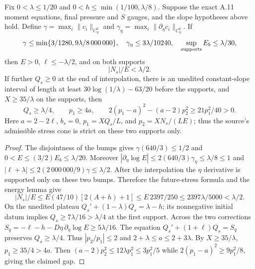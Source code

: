 \begin{theorem}
Fix $0<\lambda\le1/20$ and
$0<h\le\min(1/100,\lambda/8)$.
Suppose the exact A.11 moment equations, final pressure and $S$
gauges, and the slope hypotheses above hold. Define
$\gamma=\max_i\|c_i\|_{C^0_\eta}$ and
$\gamma_\eta=\max_i\|\partial_\eta c_i\|_{C^0_\eta}$.
If
\begin{equation}\label{eq:A11-certificate-data}
\gamma\le\min\{3/1280,9\lambda/8\,000\,000\},\quad
\gamma_\eta\le3\lambda/10240,\quad
\sup_{\rm supports}E_b\le\lambda/30,
\end{equation}
then $E>0$, $\ell\le-\lambda/2$, and on both supports
\begin{equation}\label{eq:A11-support-Ns}
\boxed{|N_s|/E<\lambda/2}.
\end{equation}
If further $Q_s\ge0$ at the end of interpolation,
there is an unedited constant-slope interval of length at least
$30\log(1/\lambda)-63/20$ before the supports, and
$X\ge35/\lambda$ on the supports, then
\begin{equation}\label{eq:A11-support-cone}
Q_s\ge\lambda/4,\qquad p_1\ge4a,\qquad
2(p_1-a)^2-(a-2)p_2^2\ge21p_1^2/40>0.
\end{equation}
Here $a=2-2\ell$, $b_s=0$,
$p_1=XQ_s/L$, and $p_2=XN_s/(LE)$; thus
the source's admissible stress cone is strict on these
two supports only.
\end{theorem}
\begin{proof}
The disjointness of the bumps gives
$\gamma(640/3)\le1/2$ and
$0<E\le(3/2)E_b\le\lambda/20$.
Moreover
$|\partial_\eta\log E|\le2(640/3)\gamma_\eta
\le\lambda/8\le1$ and
$|\ell+\lambda|\le2(2\,000\,000/9)\gamma\le\lambda/2$.
After the interpolation the $\eta$ derivative is supported only
on these two bumps. Therefore the future-stress formula and
the energy lemma give
\[
|N_s|/E\le E(47/10)[2(A+h)+1]
\le E\,2397/250\le2397\lambda/5000<\lambda/2.
\]
On the unedited plateau
$Q_s'+(1-\lambda)Q_s=\lambda-h$; its nonnegative
initial datum implies $Q_s\ge7\lambda/16>\lambda/4$
at the first support. Across the two corrections
$S_q=-\ell-h-D\eta\,\partial_\eta\log E
\ge5\lambda/16$.
The equation $Q_s'+(1+\ell)Q_s=S_q$
preserves $Q_s\ge\lambda/4$.
Thus $|p_2/p_1|\le2$ and
$2+\lambda\le a\le2+3\lambda$.
By $X\ge35/\lambda$, $p_1\ge35/4>4a$.
Then $(a-2)p_2^2\le12\lambda p_1^2
\le3p_1^2/5$ while
$2(p_1-a)^2\ge9p_1^2/8$, giving the claimed gap.
\end{proof}

